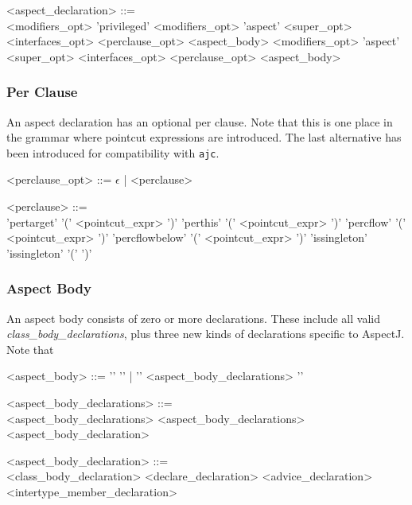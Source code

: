 \begin{minipage}{6in}
\begin{grammar}
<aspect_declaration> ::= \hspace{1in} \\
        {\red <modifiers_opt>} 'privileged' {\red <modifiers_opt>} 'aspect' {} 
          {\red <super_opt> <interfaces_opt>} <perclause_opt> <aspect_body>
\alt
        {\red <modifiers_opt>} 'aspect' {}
        {\red<super_opt> <interfaces_opt>} <perclause_opt> <aspect_body>
\end{grammar}
\end{minipage}

\subsubsection{Per Clause}

An aspect declaration has an optional per clause.  Note that this is
one place in the grammar where pointcut expressions are introduced.
The last alternative has been introduced for compatibility with
{\tt ajc}.

\begin{minipage}{6in}
\begin{grammar}
<perclause_opt> ::= $\epsilon$ |  <perclause> 

<perclause> ::= \hspace{1in} \\ 
                'pertarget' '(' {\blue <pointcut_expr>} ')'
         \alt   'perthis' '(' {\blue <pointcut_expr>} ')'
         \alt   'percflow' '(' {\blue <pointcut_expr>} ')'
         \alt   'percflowbelow' '(' {\blue <pointcut_expr>} ')'
         \alt   'issingleton'  
         \alt   'issingleton' '(' ')'
\end{grammar}
\end{minipage}

\subsubsection{Aspect Body}

An aspect body consists of zero or more declarations.   These include
all valid {\em class\_body\_declarations},  plus three new kinds of
declarations specific to AspectJ.   Note that 

\begin{minipage}{6in}
\begin{grammar}
<aspect_body> ::= '{' '}' | '{' <aspect_body_declarations> '}'

<aspect_body_declarations> ::= \hspace{1in} \\
                  <aspect_body_declarations> 
          \alt    <aspect_body_declarations> <aspect_body_declaration>

<aspect_body_declaration> ::= \hspace{1in} \\
                  {\red <class_body_declaration>}
          \alt    <declare_declaration>
          \alt    <advice_declaration>
          \alt    <intertype_member_declaration>
\end{grammar}
\end{minipage}

